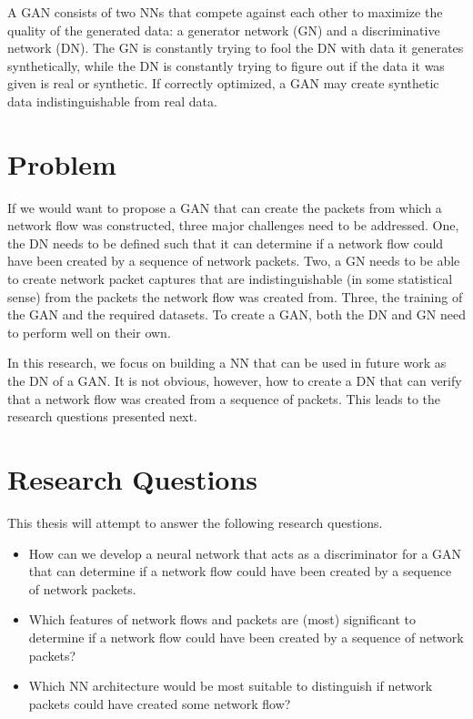 \documentclass[
	ngerman,
	ruledheaders=section,%
	class=report,%
	thesis={type=bachelor},%
	accentcolor=9c,%
	custommargins=true,%
	marginpar=false,%
	parskip=half-,%
	fontsize=11pt,%
]{tudapub}
\begin{document}
A GAN consists of two NNs that compete against each other to maximize the quality of the generated data:
a generator network (GN) and a discriminative network (DN).
The GN is constantly trying to fool the DN with data it generates synthetically,
while the DN is constantly trying to figure out if the data it was given is real or synthetic.
If correctly optimized, a GAN may create synthetic data indistinguishable from real data.

\section{Problem}

If we would want to propose a GAN that can create the packets from which a network flow was constructed,
three major challenges need to be addressed.
One, the DN needs to be defined such that it can determine if a network flow could have been created by a sequence of network packets.
Two, a GN needs to be able to create network packet captures that are indistinguishable (in some statistical sense) from the packets the network flow was created from.
Three, the training of the GAN and the required datasets.
To create a GAN, both the DN and GN need to perform well on their own.

In this research, we focus on building a NN that can be used in future work as the DN of a GAN.
It is not obvious, however, how to create a DN that
can verify that a network flow was created from a sequence of packets.
This leads to the research questions presented next.

\section{Research Questions}

This thesis will attempt to answer the following research questions.

\begin{itemize}
  \item How can we develop a neural network that acts as a discriminator for a GAN
  that can determine if a network flow could have been created by a sequence of network packets.
  \item Which features of network flows and packets are (most) significant to determine if a network flow could have been created by a sequence of network packets?
  \item Which NN architecture would be most suitable to distinguish if network packets could have created some network flow?
\end{itemize}
\end{document}
